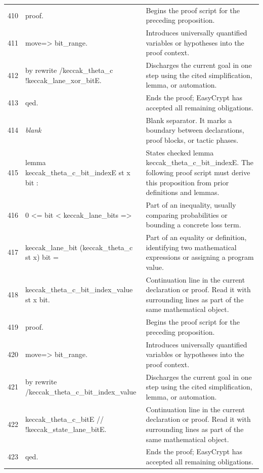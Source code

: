 \documentclass[10pt]{article}
\begin{document}
\begin{longtable}{r L{0.53\textwidth} L{0.37\textwidth}}
410 & {\ttfamily\scriptsize proof.} & Begins the proof script for the preceding proposition. \\
411 & {\ttfamily\scriptsize move=> bit\_range.} & Introduces universally quantified variables or hypotheses into the proof context. \\
412 & {\ttfamily\scriptsize by rewrite /keccak\_theta\_c !keccak\_lane\_xor\_bitE.} & Discharges the current goal in one step using the cited simplification, lemma, or automation. \\
413 & {\ttfamily\scriptsize qed.} & Ends the proof; EasyCrypt has accepted all remaining obligations. \\
414 & {\ttfamily\scriptsize \emph{blank}} & Blank separator.  It marks a boundary between declarations, proof blocks, or tactic phases. \\
415 & {\ttfamily\scriptsize lemma keccak\_theta\_c\_bit\_indexE st x bit :} & States checked lemma keccak\_theta\_c\_bit\_indexE.  The following proof script must derive this proposition from prior definitions and lemmas. \\
416 & {\ttfamily\scriptsize   0 <= bit < keccak\_lane\_bits =>} & Part of an inequality, usually comparing probabilities or bounding a concrete loss term. \\
417 & {\ttfamily\scriptsize   keccak\_lane\_bit (keccak\_theta\_c st x) bit =} & Part of an equality or definition, identifying two mathematical expressions or assigning a program value. \\
418 & {\ttfamily\scriptsize   keccak\_theta\_c\_bit\_index\_value st x bit.} & Continuation line in the current declaration or proof.  Read it with surrounding lines as part of the same mathematical object. \\
419 & {\ttfamily\scriptsize proof.} & Begins the proof script for the preceding proposition. \\
420 & {\ttfamily\scriptsize move=> bit\_range.} & Introduces universally quantified variables or hypotheses into the proof context. \\
421 & {\ttfamily\scriptsize by rewrite /keccak\_theta\_c\_bit\_index\_value} & Discharges the current goal in one step using the cited simplification, lemma, or automation. \\
422 & {\ttfamily\scriptsize            keccak\_theta\_c\_bitE // !keccak\_state\_lane\_bitE.} & Continuation line in the current declaration or proof.  Read it with surrounding lines as part of the same mathematical object. \\
423 & {\ttfamily\scriptsize qed.} & Ends the proof; EasyCrypt has accepted all remaining obligations. \\

\end{longtable}
\end{document}
